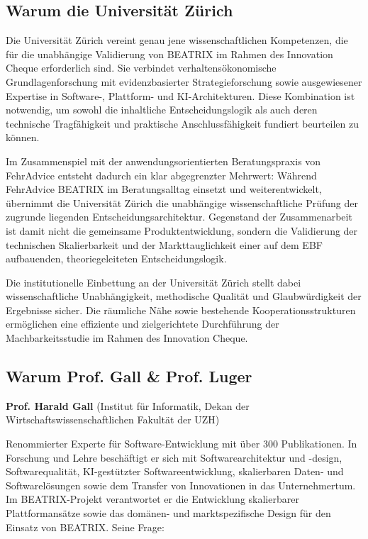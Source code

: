 \documentclass[11pt,a4paper]{article}
\begin{document}
\subsection{Warum die Universität Zürich}

Die Universität Zürich vereint genau jene wissenschaftlichen Kompetenzen, die für die unabhängige Validierung von BEATRIX im Rahmen des Innovation Cheque erforderlich sind. Sie verbindet verhaltensökonomische Grundlagenforschung mit evidenzbasierter Strategieforschung sowie ausgewiesener Expertise in Software-, Plattform- und KI-Architekturen. Diese Kombination ist notwendig, um sowohl die inhaltliche Entscheidungslogik als auch deren technische Tragfähigkeit und praktische Anschlussfähigkeit fundiert beurteilen zu können.

Im Zusammenspiel mit der anwendungsorientierten Beratungspraxis von FehrAdvice entsteht dadurch ein klar abgegrenzter Mehrwert: Während FehrAdvice BEATRIX im Beratungsalltag einsetzt und weiterentwickelt, übernimmt die Universität Zürich die unabhängige wissenschaftliche Prüfung der zugrunde liegenden Entscheidungsarchitektur. Gegenstand der Zusammenarbeit ist damit nicht die gemeinsame Produktentwicklung, sondern die Validierung der technischen Skalierbarkeit und der Markttauglichkeit einer auf dem EBF aufbauenden, theoriegeleiteten Entscheidungslogik.

Die institutionelle Einbettung an der Universität Zürich stellt dabei wissenschaftliche Unabhängigkeit, methodische Qualität und Glaubwürdigkeit der Ergebnisse sicher. Die räumliche Nähe sowie bestehende Kooperationsstrukturen ermöglichen eine effiziente und zielgerichtete Durchführung der Machbarkeitsstudie im Rahmen des Innovation Cheque.

\subsection{Warum Prof. Gall \& Prof. Luger}

\textbf{Prof. Harald Gall} (Institut für Informatik, Dekan der Wirtschaftswissenschaftlichen Fakultät der UZH)

Renommierter Experte für Software-Entwicklung mit über 300 Publikationen. In Forschung und Lehre beschäftigt er sich mit Softwarearchitektur und -design, Softwarequalität, KI-gestützter Softwareentwicklung, skalierbaren Daten- und Softwarelösungen sowie dem Transfer von Innovationen in das Unternehmertum. Im BEATRIX-Projekt verantwortet er die Entwicklung skalierbarer Plattformansätze sowie das domänen- und marktspezifische Design für den Einsatz von BEATRIX. Seine Frage:
\end{document}
